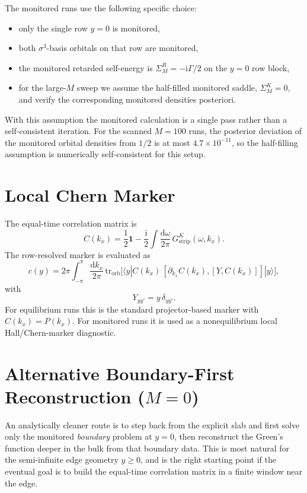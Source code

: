 \documentclass[11pt]{article}
\newcommand{\ii}{\mathrm{i}}
\newcommand{\rd}{\mathrm{d}}
\newcommand{\tr}{\mathrm{tr}}
\newcommand{\Id}{\mathbf{1}}
\newcommand{\strip}{\mathrm{strip}}
\begin{document}
The monitored runs use the following specific choice:
\begin{itemize}
\item only the single row \(y=0\) is monitored,
\item both \(\sigma^3\)-basis orbitals on that row are monitored,
\item the monitored retarded self-energy is
  \(\Sigma_M^R = -\ii \Gamma/2\) on the \(y=0\) row block,
\item for the large-\(M\) sweep we assume the half-filled monitored saddle,
  \(\Sigma_M^K=0\), and verify the corresponding monitored densities
  posteriori.
\end{itemize}

With this assumption the monitored calculation is a single pass rather than a
self-consistent iteration.  For the scanned \(M=100\) runs, the posterior
deviation of the monitored orbital densities from \(1/2\) is at most
\(4.7\times 10^{-11}\), so the half-filling assumption is numerically
self-consistent for this setup.

\section{Local Chern Marker}

The equal-time correlation matrix is
\begin{equation}
  C(k_x)
  =
  \frac{1}{2}\Id
  - \frac{\ii}{2}\int \frac{\rd\omega}{2\pi}\, G_{\strip}^K(\omega,k_x).
\end{equation}
The row-resolved marker is evaluated as
\begin{equation}
  c(y)
  =
  2\pi \int_{-\pi}^{\pi}\frac{\rd k_x}{2\pi}\,
  \tr_{\mathrm{orb}}
  \Big[
    \langle y|
    C(k_x)\,[\partial_{k_x}C(k_x),[Y,C(k_x)]]
    |y\rangle
  \Big],
\end{equation}
with
\begin{equation}
  Y_{yy'}=y\,\delta_{yy'}.
\end{equation}
For equilibrium runs this is the standard projector-based marker with
\(C(k_x)=P(k_x)\).  For monitored runs it is used as a nonequilibrium local
Hall/Chern-marker diagnostic.

\section{Alternative Boundary-First Reconstruction (\texorpdfstring{$M=0$}{M=0})}

An analytically cleaner route is to step back from the explicit slab and first
solve only the monitored \emph{boundary} problem at \(y=0\), then reconstruct
the Green's function deeper in the bulk from that boundary data.  This is most
natural for the semi-infinite edge geometry \(y\ge 0\), and is the right
starting point if the eventual goal is to build the equal-time correlation
matrix in a finite window near the edge.
\end{document}
